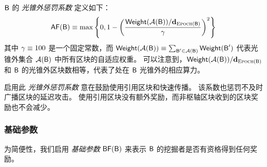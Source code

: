 $\textsf{B}$ 的 \emph{光锥外惩罚系数} 定义如下：
\begin{align}
	\mathsf{AF}(\textsf{B}) \equiv \max{\left \{{0, 1-\left(\frac{ \ensuremath{\mathsf{Weight}}(\ensuremath{\mathcal{A}}(\textsf{B}))/\mathbf{d}_{\ensuremath{\textsc{Epoch}}(\textsf{B})}
	}{\gamma}\right)^2} \right \}}
\end{align}
其中 $\gamma\equiv {{100}}$ 是一个固定常数，而 $\mathsf{Weight}(\mathcal{A}(\textsf{B})) \equiv \sum_{\textsf{B}'\in\mathcal{A}(\textsf{B})} \mathsf{Weight}(\textsf{B}')$ 代表光锥外集合 $\mathcal{A}(\textsf{B})$ 中所有区块的自适应权重。
可以注意到，$\mathsf{Weight}(\mathcal{A}(\textsf{B}))/\mathbf{d}_{\textsc{Epoch}(\textsf{B})}$ 和 $\textsf{B}$ 的光锥外区块数相等，代表了处在 $\textsf{B}$ 光锥外的相应算力。

启用此 \emph{光锥外惩罚系数} 意在鼓励使用引用区块和快速传播。
该系数也惩罚不及时广播区块的延迟攻击。
使用引用区块没有额外奖励，而非枢轴区块收到的区块奖励也不会减少。


\subsubsection{基础参数}
\label{sec:discount}

为简便性，我们启用 \emph{基础参数} $\mathsf{BF}(\textsf{B})$ 来表示 $\textsf{B}$ 的挖掘者是否有资格得到任何奖励。

